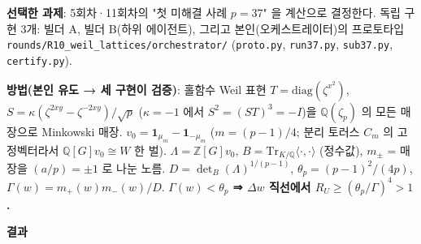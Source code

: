 \textbf{선택한 과제}: 5회차·11회차의 "첫 미해결 사례 \(p=37\)" 을 계산으로 결정한다. 독립 구현 3개: 빌더 A, 빌더 B(하위 에이전트), 그리고 본인(오케스트레이터)의 프로토타입 \texttt{rounds/R10\_weil\_lattices/orchestrator/} (\texttt{proto.py}, \texttt{run37.py}, \texttt{sub37.py}, \texttt{certify.py}).

\textbf{방법(본인 유도 → 세 구현이 검증)}: 홀함수 Weil 표현 \(T=\mathrm{diag}(\zeta^{x^2})\), \(S=\kappa(\zeta^{2xy}-\zeta^{-2xy})/\sqrt p\) (\(\kappa=-1\) 에서 \(S^2=(ST)^3=-I\))을 \(\mathbb Q(\zeta_p)\) 의 모든 매장으로 Minkowski 매장. \(v_0=\mathbf 1_{\mu_m}-\mathbf 1_{-\mu_m}\) (\(m=(p-1)/4\); 분리 토러스 \(C_m\) 의 고정벡터라서 \(\mathbb Q[G]v_0\cong W\) 한 벌). \(\Lambda=\mathbb Z[G]v_0\), \(B=\mathrm{Tr}_{K/\mathbb Q}\langle\cdot,\cdot\rangle\) (정수값), \(m_\pm\) = 매장을 \((a/p)=\pm1\) 로 나눈 노름. \(D=\det_B(\Lambda)^{1/(p-1)}\), \(\theta_p=(p-1)^2/(4p)\), \(\Gamma(w)=m_+(w)m_-(w)/D\). \textbf{\(\Gamma(w)<\theta_p\) ⇒ \(\Delta w\) 직선에서 \(R_U\ge(\theta_p/\Gamma)^4>1\).}

\textbf{결과}

